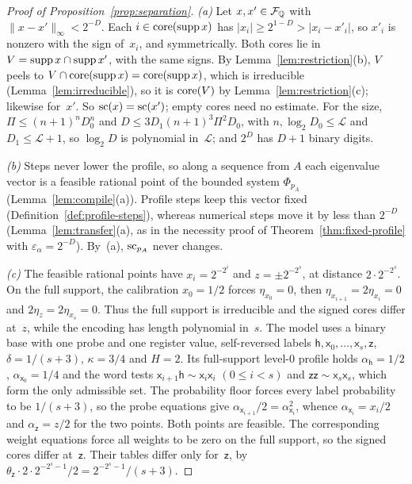 \begin{proof}[Proof of Proposition~\ref{prop:separation}]
\emph{(a)} Let $x,x'\in\mathcal F_{\mathbb{Q}}$ with $\|x-x'\|_\infty<2^{-D}$. Each
$i\in\operatorname{core}(\operatorname{supp} x)$ has $|x_i|\ge2^{1-D}>|x_i-x'_i|$, so $x'_i$ is
nonzero with the sign of~$x_i$, and symmetrically. Both cores lie in
$V=\operatorname{supp} x\cap\operatorname{supp} x'$, with the same signs. By
Lemma~\ref{lem:restriction}(b), $V$ peels to $V\cap\operatorname{core}(\operatorname{supp}
x)=\operatorname{core}(\operatorname{supp} x)$, which is irreducible (Lemma~\ref{lem:irreducible}), so
it is $\operatorname{core}(V)$ by Lemma~\ref{lem:restriction}(c); likewise for~$x'$. So
$\operatorname{sc}(x)=\operatorname{sc}(x')$; empty cores need no estimate.
For the size, $\Pi\le(n+1)^nD_0^n$ and $D\le3D_1(n+1)^3\Pi^2D_0$, with
$n,\log_2D_0\le\mathcal L$ and $D_1\le\mathcal L+1$, so $\log_2D$ is polynomial in~$\mathcal L$;
and $2^D$ has $D+1$ binary digits.

\emph{(b)} Steps never lower the profile, so along a sequence from $A$
each eigenvalue vector is a feasible rational point of the bounded system
$\Phi_{p_A}$ (Lemma~\ref{lem:compile}(a)). Profile steps keep this vector
fixed (Definition~\ref{def:profile-steps}), whereas numerical steps move
it by less than $2^{-D}$ (Lemma~\ref{lem:transfer}(a), as in the necessity
proof of Theorem~\ref{thm:fixed-profile} with $\varepsilon_\alpha=2^{-D}$).
By~(a), $\operatorname{sc}_{p_A}$ never changes.

\emph{(c)} The feasible rational points have $x_i=2^{-2^i}$ and
$z=\pm2^{-2^s}$, at distance $2\cdot2^{-2^s}$. On the full support, the
calibration $x_0=1/2$ forces $\eta_{x_0}=0$, then
$\eta_{x_{i+1}}=2\eta_{x_i}=0$ and $2\eta_z=2\eta_{x_s}=0$. Thus the full
support is irreducible and the signed cores differ at~$z$, while the
encoding has length polynomial in~$s$. The model uses a binary base with
one probe and one register value, self-reversed labels
$\mathsf h,\mathsf x_0,\dots,\mathsf x_s,\mathsf z$, $\delta=1/(s+3)$,
$\kappa=3/4$ and $H=2$. Its full-support level-$0$ profile holds
$\alpha_{\mathsf h}=1/2$, $\alpha_{\mathsf x_0}=1/4$ and the word tests
$\mathsf x_{i+1}\mathsf h\sim\mathsf x_i\mathsf x_i$ $(0\le i<s)$ and
$\mathsf{zz}\sim\mathsf x_s\mathsf x_s$, which form the only admissible
set. The probability floor forces every label probability to be $1/(s+3)$,
so the probe equations give $\alpha_{\mathsf x_{i+1}}/2=\alpha_{\mathsf
x_i}^2$, whence $\alpha_{\mathsf x_i}=x_i/2$ and $\alpha_{\mathsf z}=z/2$
for the two points. Both points are feasible. The corresponding weight equations force all
weights to be zero on the full support, so the signed cores differ
at~$\mathsf z$. Their tables differ only for~$\mathsf z$, by
$\theta_{\mathsf z}\cdot2\cdot2^{-2^s-1}/2=2^{-2^s-1}/(s+3)$.
\end{proof}

